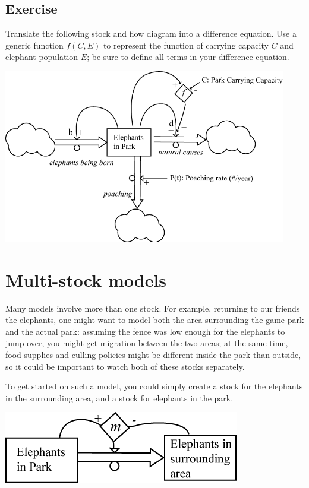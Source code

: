 \subsection{Exercise}

Translate the following stock and flow diagram into a difference equation.  Use a generic function $f(C,E)$ to represent the function of carrying capacity $C$ and elephant population $E$; be sure to define all terms in your difference equation. 

\beforefig
\includegraphics[height=3in]{figs/ElephantStockAndFlow2}
\afterfig



\section{Multi-stock models}

Many models involve more than one stock. For example, returning to our friends the elephants, one might want to model both the area surrounding the game park and the actual park:   assuming the fence was low enough for the elephants to jump over, you might get migration between the two areas; at the same time, food supplies and culling policies might be different inside the park than outside, so it could be important to watch both of these stocks separately.

To get started on such a model, you could simply create a stock for the elephants in the surrounding area, and a stock for elephants in the park.  

 \centerline{\includegraphics[height=.6in]{figs/TwoStockElephantsExample1}}

